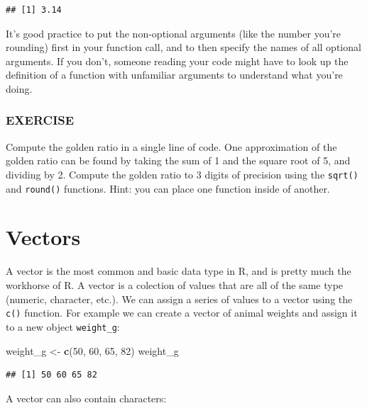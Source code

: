 \documentclass[]{book}
\newenvironment{Shaded}{\begin{snugshade}}{\end{snugshade}}
\newcommand{\DecValTok}[1]{\textcolor[rgb]{0.00,0.00,0.81}{#1}}
\newcommand{\KeywordTok}[1]{\textcolor[rgb]{0.13,0.29,0.53}{\textbf{#1}}}
\newcommand{\NormalTok}[1]{#1}
\newcommand{\StringTok}[1]{\textcolor[rgb]{0.31,0.60,0.02}{#1}}
\begin{document}
\begin{verbatim}
## [1] 3.14
\end{verbatim}

It's good practice to put the non-optional arguments (like the number you're rounding) first in your function call, and to then specify the names of all optional arguments. If you don't, someone reading your code might have to look up the definition of a function with unfamiliar arguments to understand what you're doing.

\hypertarget{exercise-5}{%
\subsubsection*{EXERCISE}\label{exercise-5}}

Compute the golden ratio in a single line of code. One approximation of the golden ratio can be found by taking the sum of 1 and the square root of 5, and dividing by 2. Compute the golden ratio to 3 digits of precision using the \texttt{sqrt()} and \texttt{round()} functions. Hint: you can place one function inside of another.

\hypertarget{vectors}{%
\section{Vectors}\label{vectors}}

A vector is the most common and basic data type in R, and is pretty much the workhorse of R. A vector is a colection of values that are all of the same type (numeric, character, etc.). We can assign a series of values to a vector using the \texttt{c()} function. For example we can create a vector of animal weights and assign it to a new object \texttt{weight\_g}:

\begin{Shaded}
\begin{Highlighting}[]
\NormalTok{weight_g <-}\StringTok{ }\KeywordTok{c}\NormalTok{(}\DecValTok{50}\NormalTok{, }\DecValTok{60}\NormalTok{, }\DecValTok{65}\NormalTok{, }\DecValTok{82}\NormalTok{)}
\NormalTok{weight_g}
\end{Highlighting}
\end{Shaded}

\begin{verbatim}
## [1] 50 60 65 82
\end{verbatim}

A vector can also contain characters:
\end{document}
